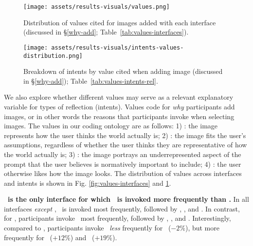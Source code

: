 \begin{figure}[!t]
    \begin{minipage}[t]{0.53\textwidth}
        \centering
        \texttt{[image: assets/results-visuals/values.png]}
        \caption{Distribution of values cited for images added with each interface (discussed in \S\ref{why-add}; Table~\ref{tab:values-interfaces}).}
        \label{fig:values-interfaces}
    \end{minipage}
    \hfill
    \begin{minipage}[t]{0.45\textwidth}
        \centering
        \texttt{[image: assets/results-visuals/intents-values-distribution.png]}
        \caption{Breakdown of intents by value cited when adding image (discussed in \S\ref{why-add}); Table~\ref{tab:values-intents-rel}.}
        \label{fig:intents-values}
    \end{minipage}
\end{figure}





We also explore whether different values may serve as a relevant explanatory variable for types of reflection (intents). Values code for \textit{why} participants add images, or in other words the reasons that participants invoke when selecting images. The values in our coding ontology are as follows: 1) \realism: the image represents how the user thinks the world actually is; 2) \familiarity: the image fits the user's assumptions, regardless of whether the user thinks they are representative of how the world actually is; 3) \diversity: the image portrays an underrepresented aspect of the prompt that the user believes is normatively important to include; 4) \aesthetics: the user otherwise likes how the image looks. The distribution of values across interfaces and intents is shown in Fig. \ref{fig:values-interfaces} and \ref{fig:intents-values}.

\textbf{\agonistic~is the only interface for which \diversity~is invoked more frequently than \familiarity.} In all interfaces \textit{except} \agonistic, \familiarity~is invoked most frequently, followed by \realism, \diversity, and \aesthetics. In contrast, for \agonistic, participants invoke \diversity~most frequently, followed by \realism, \familiarity, and \aesthetics. Interestingly, compared to \baseline, participants invoke \diversity~\textit{less} frequently for \diverse~($-2\%$), but more frequently for ~($+12\%$) and \agonistic~($+19\%$).


